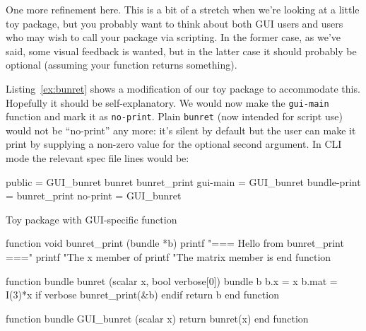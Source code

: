 \documentclass[oneside]{book}
\begin{document}

One more refinement here. This is a bit of a stretch when we're
looking at a little toy package, but you probably want to think about
both GUI users and users who may wish to call your package via
scripting. In the former case, as we've said, some visual feedback is
wanted, but in the latter case it should probably be optional
(assuming your function returns something).

Listing~\ref{ex:bunret} shows a modification of our toy package to
accommodate this. Hopefully it should be self-explanatory. We would
now make  the \texttt{gui-main} function and mark
it as \texttt{no-print}. Plain \texttt{bunret} (now intended for
script use) would not be ``no-print'' any more: it's silent by default
but the user can make it print by supplying a non-zero value for the
optional second argument. In CLI mode the relevant \textsf{spec} file
lines would be:

\begin{code}
public = GUI_bunret bunret bunret_print
gui-main = GUI_bunret
bundle-print = bunret_print
no-print = GUI_bunret
\end{code}

\begin{script}[htbp]
\caption{Toy package with GUI-specific function}
\label{ex:bunret}
\begin{scode}
function void bunret_print (bundle *b)
  printf "=== Hello from bunret_print ===\n\n"
  printf "The x member of %
  printf "The matrix member is\n\n%
end function

function bundle bunret (scalar x, bool verbose[0])
  bundle b
  b.x = x
  b.mat = I(3)*x
  if verbose
    bunret_print(&b)
  endif
  return b
end function

function bundle GUI_bunret (scalar x)
  return bunret(x)
end function
\end{scode}
\end{script}
\end{document}
